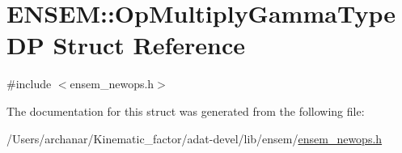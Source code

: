 \hypertarget{structENSEM_1_1OpMultiplyGammaTypeDP}{}\section{E\+N\+S\+EM\+:\+:Op\+Multiply\+Gamma\+Type\+DP Struct Reference}
\label{structENSEM_1_1OpMultiplyGammaTypeDP}


{\ttfamily \#include $<$ensem\+\_\+newops.\+h$>$}



The documentation for this struct was generated from the following file\+:\begin{DoxyCompactItemize}
\item 
/\+Users/archanar/\+Kinematic\+\_\+factor/adat-\/devel/lib/ensem/\mbox{\hyperlink{adat-devel_2lib_2ensem_2ensem__newops_8h}{ensem\+\_\+newops.\+h}}\end{DoxyCompactItemize}
